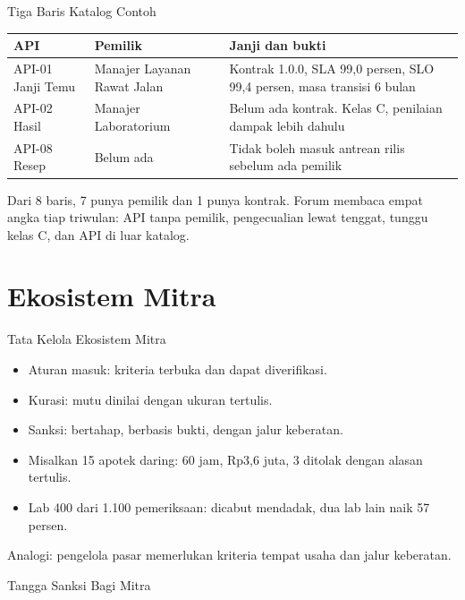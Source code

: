 \documentclass[aspectratio=169, table, 12pt]{beamer}
\begin{document}
\begin{frame}{{\Large Tiga Baris Katalog Contoh}}
  \footnotesize
  \begin{tabularx}{\textwidth}{>{\raggedright\arraybackslash}p{2.5cm} >{\raggedright\arraybackslash}p{2.9cm} >{\raggedright\arraybackslash}X}
    \hline
    \textbf{API} & \textbf{Pemilik} & \textbf{Janji dan bukti} \\ \hline
    API-01 Janji Temu & Manajer Layanan Rawat Jalan & Kontrak 1.0.0, SLA 99,0 persen, SLO 99,4 persen, masa transisi 6 bulan \\ \hline
    API-02 Hasil & Manajer Laboratorium & Belum ada kontrak. Kelas C, penilaian dampak lebih dahulu \\ \hline
    API-08 Resep & Belum ada & Tidak boleh masuk antrean rilis sebelum ada pemilik \\ \hline
  \end{tabularx}

  \vspace{8pt}
  \small Dari 8 baris, 7 punya pemilik dan 1 punya kontrak. Forum membaca empat angka tiap triwulan: API tanpa pemilik, pengecualian lewat tenggat, tunggu kelas C, dan API di luar katalog.
\end{frame}

\section{Ekosistem Mitra}

\begin{frame}{{\Large Tata Kelola Ekosistem Mitra}}
  \vspace{6pt}
  \begin{itemize}
    \item Aturan masuk: kriteria terbuka dan dapat diverifikasi.
    \item Kurasi: mutu dinilai dengan ukuran tertulis.
    \item Sanksi: bertahap, berbasis bukti, dengan jalur keberatan.
    \item Misalkan 15 apotek daring: 60 jam, Rp3,6 juta, 3 ditolak dengan alasan tertulis.
    \item Lab 400 dari 1.100 pemeriksaan: dicabut mendadak, dua lab lain naik 57 persen.
  \end{itemize}
  \vspace{4pt}
  {\small Analogi: pengelola pasar memerlukan kriteria tempat usaha dan jalur keberatan.}
\end{frame}

\begin{frame}{{\Large Tangga Sanksi Bagi Mitra}}
  \centering
\end{frame}
\end{document}
